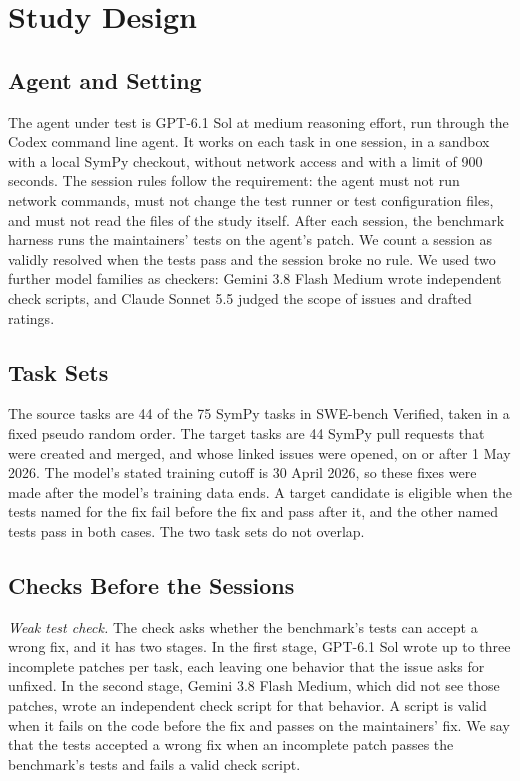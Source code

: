 \documentclass[runningheads]{llncs}
\begin{document}
\section{Study Design}
\label{sec:design}

\subsection{Agent and Setting}
The agent under test is GPT-6.1 Sol at medium reasoning effort, run through the Codex command line agent. It works on each task in one session, in a sandbox with a local SymPy checkout, without network access and with a limit of 900 seconds. The session rules follow the requirement: the agent must not run network commands, must not change the test runner or test configuration files, and must not read the files of the study itself. After each session, the benchmark harness runs the maintainers' tests on the agent's patch. We count a session as validly resolved when the tests pass and the session broke no rule. We used two further model families as checkers: Gemini 3.8 Flash Medium wrote independent check scripts, and Claude Sonnet 5.5 judged the scope of issues and drafted ratings.

\subsection{Task Sets}
The source tasks are 44 of the 75 SymPy tasks in SWE-bench Verified, taken in a fixed pseudo random order. The target tasks are 44 SymPy pull requests that were created and merged, and whose linked issues were opened, on or after 1 May 2026. The model's stated training cutoff is 30 April 2026, so these fixes were made after the model's training data ends. A target candidate is eligible when the tests named for the fix fail before the fix and pass after it, and the other named tests pass in both cases. The two task sets do not overlap.

\subsection{Checks Before the Sessions}
\label{sec:checks}
\emph{Weak test check.} The check asks whether the benchmark's tests can accept a wrong fix, and it has two stages. In the first stage, GPT-6.1 Sol wrote up to three incomplete patches per task, each leaving one behavior that the issue asks for unfixed. In the second stage, Gemini 3.8 Flash Medium, which did not see those patches, wrote an independent check script for that behavior. A script is valid when it fails on the code before the fix and passes on the maintainers' fix. We say that the tests accepted a wrong fix when an incomplete patch passes the benchmark's tests and fails a valid check script.
\end{document}
